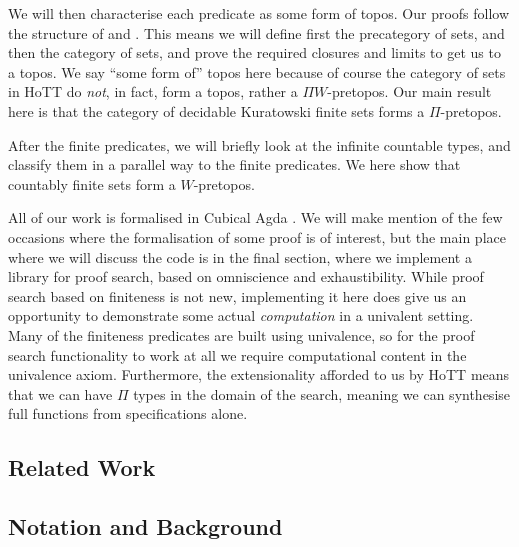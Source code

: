 We will then characterise each predicate as some form of topos.
Our proofs follow the structure of \cite[Chapters 9, 10]{hottbook} and
\cite{rijkeSetsHomotopyType2015}.
This means we will define first the precategory of sets, and then the category
of sets, and prove the required closures and limits to get us to a topos.
We say ``some form of'' topos here because of course the category of sets in
HoTT do \emph{not}, in fact, form a topos, rather a \(\Pi W\)-pretopos.
Our main result here is that the category of decidable Kuratowski finite sets
forms a \(\Pi\)-pretopos.

After the finite predicates, we will briefly look at the infinite countable
types, and classify them in a parallel way to the finite predicates.
We here show that countably finite sets form a \(W\)-pretopos.

All of our work is formalised in Cubical Agda
\cite{vezzosiCubicalAgdaDependently2019}.
We will make mention of the few occasions where the formalisation of some proof
is of interest, but the main place where we will discuss the code is in the
final section, where we implement a library for proof search, based on
omniscience and exhaustibility.
While proof search based on finiteness is not new, implementing it here does
give us an opportunity to demonstrate some actual \emph{computation} in a
univalent setting.
Many of the finiteness predicates are built using univalence, so for the proof
search functionality to work at all we require computational content in the
univalence axiom.
Furthermore, the extensionality afforded to us by HoTT means that we can have
\(\Pi\) types in the domain of the search, meaning we can synthesise full
functions from specifications alone.
\subsection{Related Work}
\subsection{Notation and Background}

